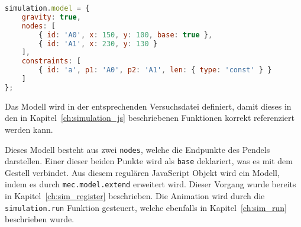 \begin{lstlisting}[language=JavaScript, caption={Definition eines Pendels in \name{mec2} inklusive Animation.}, label={lst:pendel}]
simulation.model = {
    gravity: true,
    nodes: [
        { id: 'A0', x: 150, y: 100, base: true },
        { id: 'A1', x: 230, y: 130 }
    ],
    constraints: [
        { id: 'a', p1: 'A0', p2: 'A1', len: { type: 'const' } }
    ]
};
\end{lstlisting}

Das  Modell wird in der entsprechenden Versuchsdatei definiert, damit dieses in den in Kapitel~\ref{ch:simulation_js} beschriebenen Funktionen korrekt referenziert werden kann.

Dieses Modell besteht aus zwei \lstinline{nodes}, welche die Endpunkte des Pendels darstellen.
Einer dieser beiden Punkte wird als \lstinline{base} deklariert, was es mit dem Gestell verbindet.
Aus diesem regulären JavaScript Objekt wird ein  Modell, indem es durch \lstinline{mec.model.extend} erweitert wird.
Dieser Vorgang wurde bereits in Kapitel~\ref{ch:sim_register} beschrieben.
Die Animation wird durch die \lstinline{simulation.run} Funktion gesteuert, welche ebenfalls in Kapitel~\ref{ch:sim_run} beschrieben wurde.